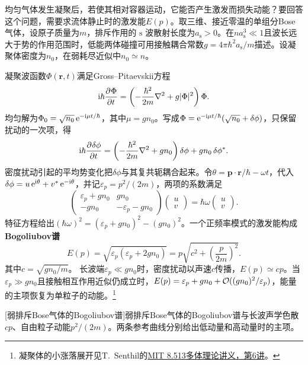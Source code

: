 均匀气体发生凝聚后，若使其相对容器运动，它能否产生激发而损失动能？要回答这个问题，需要求流体静止时的激发能$E(p)$。取三维、接近零温的单组分Bose气体，设原子质量为$m$，排斥作用的 $\mathrm s$ 波散射长度为$a_{\mathrm s} > 0$。在$n a_{\mathrm s}^3 \ll 1$且波长远大于势的作用范围时，低能两体碰撞可用接触耦合常数$g = 4\pi\hbar^2a_{\mathrm s}/m$描述。设凝聚体密度为$n_0$，在弱耗尽近似中$n_0 \simeq n$。

凝聚波函数$\Phi(\bm r,t)$满足Gross--Pitaevskii方程
\begin{equation}
	\label{eq:sm-gross-pitaevskii}
	\mathrm{i}\hbar\frac{\partial^{}\Phi}{\partial{t}^{}} = \left(-\frac{\hbar^2}{2m}\nabla^2 + g\lvert\Phi\rvert^2\right)\Phi .
\end{equation}
均匀解为$\Phi_0 = \sqrt{n_0}\mathop{}\!\mathrm{e}^{-\mathrm{i}\mu t/\hbar}$，其中$\mu = gn_0$。写成$\Phi = \mathop{}\!\mathrm{e}^{-\mathrm{i}\mu t/\hbar}(\sqrt{n_0} + \delta\phi)$，只保留扰动的一次项，得
\[
	\mathrm{i}\hbar\frac{\partial^{}\delta\phi}{\partial{t}^{}}
	= \left(-\frac{\hbar^2}{2m}\nabla^2 + gn_0\right)\delta\phi + gn_0\,\delta\phi^* .
\]
密度扰动引起的平均势变化把$\delta\phi$与其复共轭耦合起来。令$\theta = \bm p \cdot \bm r/\hbar - \omega t$，代入$\delta\phi = u\mathop{}\!\mathrm{e}^{\mathrm{i}\theta} + v^*\mathop{}\!\mathrm{e}^{-\mathrm{i}\theta}$，并记$\varepsilon_p = p^2/(2m)$，两项的系数满足
\[
	\begin{pmatrix}
		\varepsilon_p + gn_0 & gn_0\\
		-gn_0 & -\varepsilon_p - gn_0
	\end{pmatrix}
	\begin{pmatrix}u\\v\end{pmatrix}
	= \hbar\omega\begin{pmatrix}u\\v\end{pmatrix}.
\]
特征方程给出$(\hbar\omega)^2 = (\varepsilon_p + gn_0)^2 - (gn_0)^2$。一个正频率模式的激发能构成\textbf{Bogoliubov谱}
\begin{equation}
	\label{eqn:bogoliubov spectrum}
	E(p) = \sqrt{\varepsilon_p(\varepsilon_p + 2gn_0)}
	= p\sqrt{c^2 + \left(\frac{p}{2m}\right)^2}.
\end{equation}
其中$c = \sqrt{gn_0/m}$。
长波端$\varepsilon_p \ll gn_0$时，密度扰动以声速$c$传播，$E(p) \simeq cp$。当$\varepsilon_p \gg gn_0$且接触相互作用近似仍成立时，$E(p) = \varepsilon_p + gn_0 + \mathcal{O}((gn_0)^2/\varepsilon_p)$，能量的主项恢复为单粒子的动能。\footnote{凝聚体的小涨落展开见T.~Senthil的\href{https://ocw.mit.edu/courses/8-513-many-body-theory-for-condensed-matter-systems-fall-2004/resources/notes6/}{MIT 8.513多体理论讲义，第6讲}。}
\begin{notecaptionblock}
	[弱排斥Bose气体的Bogoliubov谱]{弱排斥Bose气体的Bogoliubov谱与长波声学色散$cp$、自由粒子动能$p^2/(2m)$。两条参考曲线分别给出低动量和高动量时的主项。}
	\label{fig:bogoliubov-spectrum}
\end{notecaptionblock}

